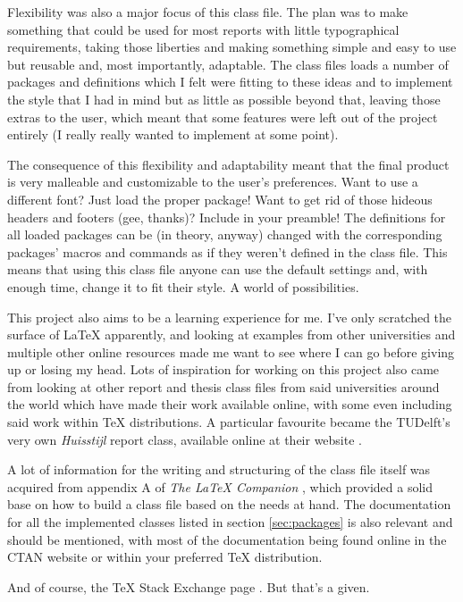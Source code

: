 \documentclass[palatino,english]{ist-report}
\begin{document}
Flexibility was also a major focus of this class file. The plan was to make something that could be used for most reports with little typographical requirements, taking those liberties and making something simple and easy to use but reusable and, most importantly, adaptable. The class files loads a number of packages and definitions which I felt were fitting to these ideas and to implement the style that I had in mind but as little as possible beyond that, leaving those extras to the user, which meant that some features were left out of the project entirely (I really really wanted to implement  at some point).

The consequence of this flexibility and adaptability meant that the final product is very malleable and customizable to the user's preferences. Want to use a different font? Just load the proper package! Want to get rid of those hideous headers and footers (gee, thanks)? Include \texttt{\fancyhf{}} in your preamble! The definitions for all loaded packages can be (in theory, anyway) changed with the corresponding packages' macros and commands as if they weren't defined in the class file. This means that using this class file anyone can use the default settings and, with enough time, change it to fit their style. A world of possibilities.

This project also aims to be a learning experience for me. I've only scratched the surface of \LaTeX{} apparently, and looking at examples from other universities and multiple other online resources made me want to see where I can go before giving up or losing my head. Lots of inspiration for working on this project also came from looking at other report and thesis class files from said universities around the world which have made their work available online, with some even including said work within \TeX{} distributions. A particular favourite became the TUDelft's very own \textit{Huisstijl} report class, available online at their website \cite{tudelft-huisstijl}.

A lot of information for the writing and structuring of the class file itself was acquired from appendix A of \textit{The \LaTeX{} Companion} \cite{latex-companion}, which provided a solid base on how to build a class file based on the needs at hand. The documentation for all the implemented classes listed in section \ref{sec:packages} is also relevant and should be mentioned, with most of the documentation being found online in the CTAN website \cite{ctan} or within your preferred \TeX{} distribution.
\medskip\par
And of course, the \TeX{} Stack Exchange page \cite{texsx}. But that's a given.
\end{document}

